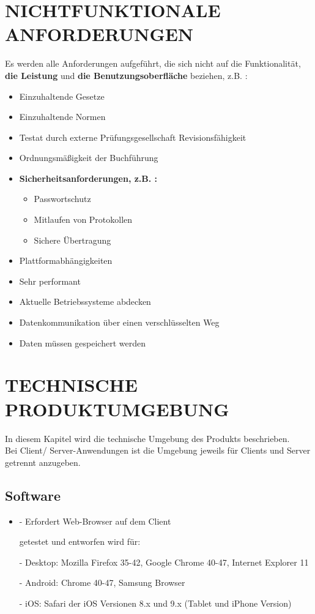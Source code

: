 	\section{\Large NICHTFUNKTIONALE ANFORDERUNGEN}
	Es werden alle Anforderungen aufgeführt, die sich nicht auf die Funktionalität, \textbf{ die Leistung} und \textbf{ die Benutzungsoberfläche} beziehen, z.B. :
	\begin{itemize}
		\item Einzuhaltende Gesetze
		\item Einzuhaltende Normen
		\item Testat durch externe Prüfungsgesellschaft
		Revisionsfähigkeit 
		\item Ordnungsmäßigkeit der Buchführung
		\item \textbf{ Sicherheitsanforderungen, z.B. :}
		\begin{itemize}
			\item Passwortschutz
			\item Mitlaufen von Protokollen
			\item Sichere Übertragung
		\end{itemize}  
		\item Plattformabhängigkeiten
		\item Sehr performant
		\item Aktuelle Betriebssysteme abdecken
		\item Datenkommunikation über einen verschlüsselten Weg
		\item Daten müssen gespeichert werden
		 
	\end{itemize} 

	
	\section{\Large TECHNISCHE PRODUKTUMGEBUNG}
   	In diesem Kapitel wird die technische Umgebung des Produkts beschrieben.\\
   	Bei Client/ Server-Anwendungen ist die Umgebung jeweils für Clients und Server getrennt anzugeben.
	\subsection{Software}
	\begin{itemize}
		\item - Erfordert Web-Browser auf dem Client
		
		getestet und entworfen wird für:
		
		- Desktop:
		Mozilla Firefox 35-42, Google Chrome 40-47, Internet Explorer 11
		
		- Android:
		Chrome 40-47, Samsung Browser
		
		- iOS:
		Safari der iOS Versionen 8.x und 9.x (Tablet und iPhone Version)
	\end{itemize}
